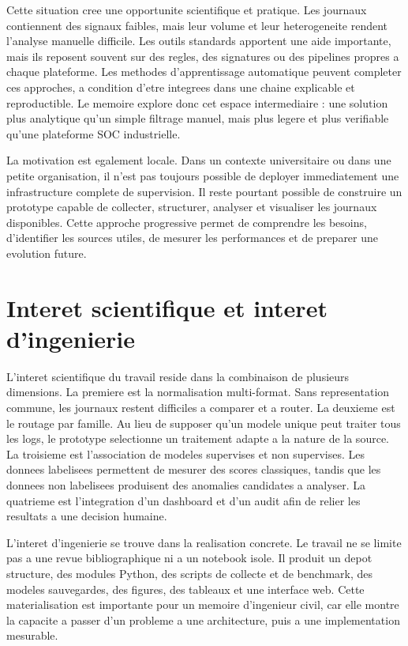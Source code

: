 Cette situation cree une opportunite scientifique et pratique. Les journaux contiennent des signaux faibles, mais leur volume et leur heterogeneite rendent l'analyse manuelle difficile. Les outils standards apportent une aide importante, mais ils reposent souvent sur des regles, des signatures ou des pipelines propres a chaque plateforme. Les methodes d'apprentissage automatique peuvent completer ces approches, a condition d'etre integrees dans une chaine explicable et reproductible. Le memoire explore donc cet espace intermediaire : une solution plus analytique qu'un simple filtrage manuel, mais plus legere et plus verifiable qu'une plateforme SOC industrielle.

La motivation est egalement locale. Dans un contexte universitaire ou dans une petite organisation, il n'est pas toujours possible de deployer immediatement une infrastructure complete de supervision. Il reste pourtant possible de construire un prototype capable de collecter, structurer, analyser et visualiser les journaux disponibles. Cette approche progressive permet de comprendre les besoins, d'identifier les sources utiles, de mesurer les performances et de preparer une evolution future.

\section{Interet scientifique et interet d'ingenierie}
L'interet scientifique du travail reside dans la combinaison de plusieurs dimensions. La premiere est la normalisation multi-format. Sans representation commune, les journaux restent difficiles a comparer et a router. La deuxieme est le routage par famille. Au lieu de supposer qu'un modele unique peut traiter tous les logs, le prototype selectionne un traitement adapte a la nature de la source. La troisieme est l'association de modeles supervises et non supervises. Les donnees labelisees permettent de mesurer des scores classiques, tandis que les donnees non labelisees produisent des anomalies candidates a analyser. La quatrieme est l'integration d'un dashboard et d'un audit afin de relier les resultats a une decision humaine.

L'interet d'ingenierie se trouve dans la realisation concrete. Le travail ne se limite pas a une revue bibliographique ni a un notebook isole. Il produit un depot structure, des modules Python, des scripts de collecte et de benchmark, des modeles sauvegardes, des figures, des tableaux et une interface web. Cette materialisation est importante pour un memoire d'ingenieur civil, car elle montre la capacite a passer d'un probleme a une architecture, puis a une implementation mesurable.

